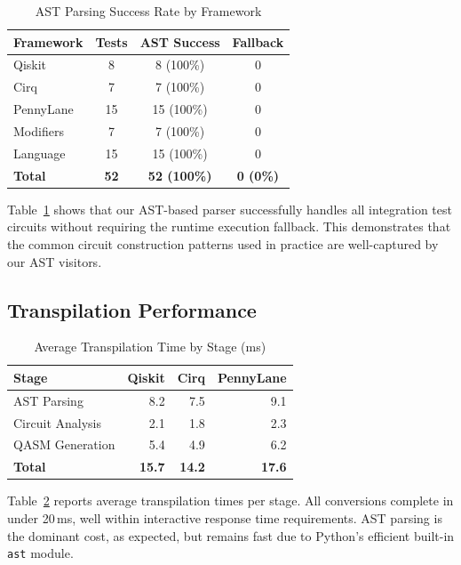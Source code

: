 \documentclass[conference]{IEEEtran}
\begin{document}
\begin{table}[t]
\centering
\caption{AST Parsing Success Rate by Framework}
\label{tab:parsing}
\begin{tabular}{@{}lccc@{}}
\toprule
\textbf{Framework} & \textbf{Tests} & \textbf{AST Success} & \textbf{Fallback} \\
\midrule
Qiskit     & 8  & 8 (100\%) & 0 \\
Cirq       & 7  & 7 (100\%) & 0 \\
PennyLane  & 15 & 15 (100\%) & 0 \\
Modifiers  & 7  & 7 (100\%) & 0 \\
Language   & 15 & 15 (100\%) & 0 \\
\midrule
\textbf{Total} & \textbf{52} & \textbf{52 (100\%)} & \textbf{0 (0\%)} \\
\bottomrule
\end{tabular}
\end{table}

Table~\ref{tab:parsing} shows that our AST-based parser successfully handles all integration test circuits without requiring the runtime execution fallback. This demonstrates that the common circuit construction patterns used in practice are well-captured by our AST visitors.

\subsection{Transpilation Performance}

\begin{table}[t]
\centering
\caption{Average Transpilation Time by Stage (ms)}
\label{tab:performance}
\begin{tabular}{@{}lrrr@{}}
\toprule
\textbf{Stage} & \textbf{Qiskit} & \textbf{Cirq} & \textbf{PennyLane} \\
\midrule
AST Parsing       & 8.2  & 7.5  & 9.1 \\
Circuit Analysis   & 2.1  & 1.8  & 2.3 \\
QASM Generation    & 5.4  & 4.9  & 6.2 \\
\midrule
\textbf{Total}     & \textbf{15.7} & \textbf{14.2} & \textbf{17.6} \\
\bottomrule
\end{tabular}
\end{table}

Table~\ref{tab:performance} reports average transpilation times per stage. All conversions complete in under 20\,ms, well within interactive response time requirements. AST parsing is the dominant cost, as expected, but remains fast due to Python's efficient built-in \texttt{ast} module.
\end{document}
